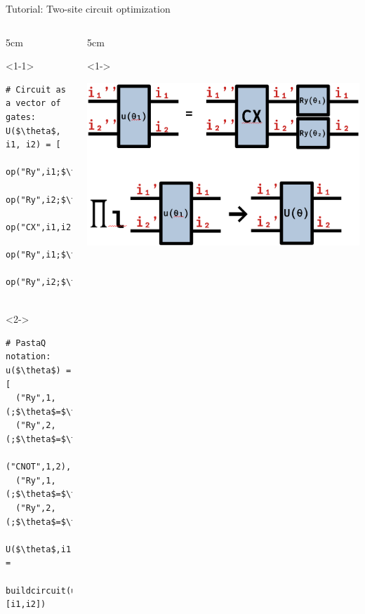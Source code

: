 \begin{frame}[fragile]{Tutorial: Two-site circuit optimization}

\begin{columns}

\begin{column}{5cm}

\begin{onlyenv}<1-1>
\begin{lstlisting}[language=JuliaLocal, style=julia, mathescape, basicstyle=\scriptsize\ttfamily]
# Circuit as a vector of gates:
U($\theta$, i1, i2) = [
  op("Ry",i1;$\theta$=$\theta$[1]),
  op("Ry",i2;$\theta$=$\theta$[2]),
  op("CX",i1,i2),
  op("Ry",i1;$\theta$=$\theta$[3]),
  op("Ry",i2;$\theta$=$\theta$[4])]


 \end{lstlisting}
\end{onlyenv}

\begin{onlyenv}<2->
\begin{lstlisting}[language=JuliaLocal, style=julia, mathescape, basicstyle=\scriptsize\ttfamily]
# PastaQ notation:
u($\theta$) = [
  ("Ry",1,(;$\theta$=$\theta$[1])),
  ("Ry",2,(;$\theta$=$\theta$[2])),
  ("CNOT",1,2),
  ("Ry",1,(;$\theta$=$\theta$[3])),
  ("Ry",2,(;$\theta$=$\theta$[4]))]

U($\theta$,i1,i2) =
 buildcircuit(u($\theta$),[i1,i2])
\end{lstlisting}
\end{onlyenv}

\end{column}

\begin{column}{5cm}

\begin{onlyenv}<1->
\vspace*{0.0cm}
\begin{center}
\includegraphics[width=1.0\textwidth]{
  slides/assets/U12.png
}
\end{center}
\vspace*{0.0cm}
\end{onlyenv}

\end{column}

\end{columns}

\end{frame}
